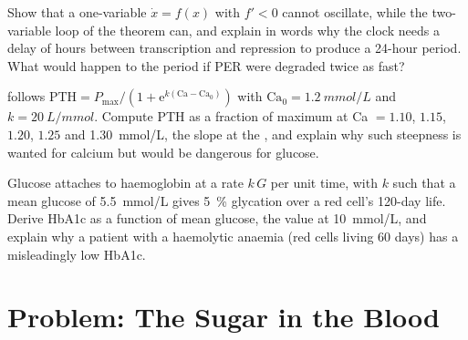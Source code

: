 \begin{exercise}[$\star\star\star$]\label{exo:b3:endocrinology:10}
Show that a one-variable  $\dot x = f(x)$ with $f' < 0$
cannot oscillate, while the two-variable loop of the theorem can, and
explain in words why the clock needs a delay of hours between
transcription and repression to produce a 24-hour period. What would
happen to the period if PER were degraded twice as fast?
\end{exercise}

\begin{exercise}[$\star\star\star$]\label{exo:b3:endocrinology:11}
 follows $\text{PTH} = P_{\max}/(1 +
\mathrm{e}^{k(\text{Ca} - \text{Ca}_{0})})$ with $\text{Ca}_{0} =
\qty{1.2}{mmol/L}$ and $k = \qty{20}{L/mmol}$. Compute PTH as a fraction
of maximum at Ca $= 1.10$, $1.15$, $1.20$, $1.25$ and \qty{1.30}{mmol/L},
the slope at the , and explain why such steepness is wanted
for calcium but would be dangerous for glucose.
\end{exercise}

\begin{exercise}[$\star\star\star$]\label{exo:b3:endocrinology:12}
Glucose attaches to haemoglobin at a rate $k\,G$ per unit time, with
$k$ such that a mean glucose of \qty{5.5}{mmol/L} gives \qty{5}{\%}
glycation over a red cell's 120-day life. Derive HbA1c as a function of
mean glucose, the value at \qty{10}{mmol/L}, and explain why a patient
with a haemolytic anaemia (red cells living 60 days) has a misleadingly
low HbA1c.
\end{exercise}

\section{Problem: The Sugar in the Blood}

